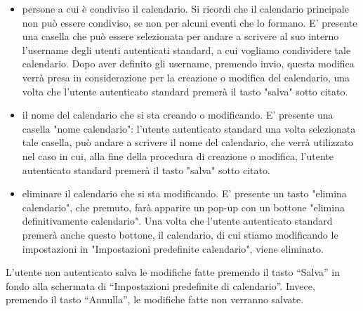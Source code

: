 \begin{listaPersonale}[UC]{}
\begin{listaPersonale2}[UC] {}
\begin{enumerate}
\begin{itemize}
                    \item persone a cui è condiviso il calendario. Si ricordi che il calendario principale non può essere condiviso, se non per alcuni eventi che lo formano. E' presente una casella che può essere selezionata per andare a scrivere al suo interno l'username degli utenti autenticati standard, a cui vogliamo condividere tale calendario. 
                    Dopo aver definito gli username, premendo invio, questa modifica verrà presa in considerazione per la creazione o modifica del calendario, una volta che l'utente autenticato standard premerà il tasto "salva" sotto citato.
                    \item il nome del calendario che si sta creando o modificando. E' presente una casella "nome calendario": l'utente autenticato standard una volta selezionata tale casella, può andare a scrivere il nome del calendario, che verrà utilizzato nel caso in cui, alla fine della procedura di creazione o modifica, l'utente autenticato standard premerà il tasto "salva" sotto citato.               
                    \item eliminare il calendario che si sta modificando. E' presente un tasto "elimina calendario", che premuto, farà apparire un pop-up con un bottone "elimina definitivamente calendario". Una volta che l'utente autenticato standard premerà anche questo bottone, il calendario, di cui stiamo modificando le impostazioni in "Impostazioni predefinite calendario", viene eliminato. 
                \end{itemize}
            L'utente non autenticato salva le modifiche fatte premendo il tasto “Salva” in fondo alla schermata di “Impostazioni predefinite di calendario”. Invece, premendo il tasto “Annulla”, le modifiche fatte non verranno salvate.
            \end{enumerate}
        

\end{listaPersonale2}
\end{listaPersonale}
